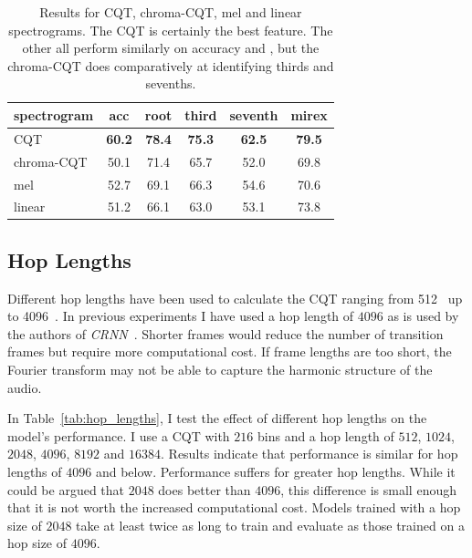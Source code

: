 \begin{table}[h]
    \centering
    \begin{tabular}{lccccc}
        \toprule
        spectrogram & acc & root & third & seventh & mirex \\  
        \midrule
        CQT & \textbf{60.2} & \textbf{78.4} & \textbf{75.3} & \textbf{62.5} & \textbf{79.5} \\
        chroma-CQT & 50.1 & 71.4 & 65.7 & 52.0 & 69.8 \\
        mel & 52.7 & 69.1 & 66.3 & 54.6 & 70.6 \\
        linear & 51.2 & 66.1 & 63.0 & 53.1 & 73.8 \\
        \bottomrule
    \end{tabular}
    \caption{Results for CQT, chroma-CQT, mel and linear spectrograms. The CQT is certainly the best feature. The other all perform similarly on accuracy and , but the chroma-CQT does comparatively at identifying thirds and sevenths. }\label{tab:spectrograms}
\end{table}

\subsection{Hop Lengths}\label{sec:hop-lengths}

Different hop lengths have been used to calculate the CQT ranging from 512~\cite{ACRLargeVocab1} up to 4096~\citep{StructuredTraining}. In previous experiments I have used a hop length of $4096$ as is used by the authors of \emph{CRNN}~\citep{StructuredTraining}. Shorter frames would reduce the number of transition frames but require more computational cost. If frame lengths are too short, the Fourier transform may not be able to capture the harmonic structure of the audio.

In Table~\ref{tab:hop_lengths}, I test the effect of different hop lengths on the model's performance. I use a CQT with $216$ bins and a hop length of $512$, $1024$, $2048$, $4096$, $8192$ and $16384$. Results indicate that performance is similar for hop lengths of $4096$ and below. Performance suffers for greater hop lengths. While it could be argued that $2048$ does better than $4096$, this difference is small enough that it is not worth the increased computational cost. Models trained with a hop size of $2048$ take at least twice as long to train and evaluate as those trained on a hop size of $4096$.

